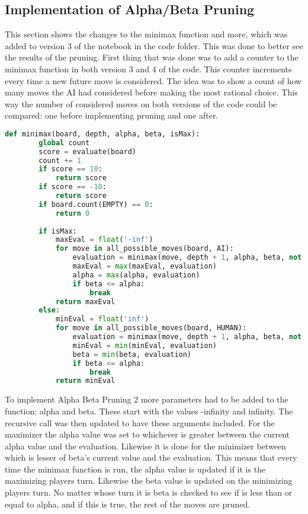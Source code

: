 \subsection{Implementation of Alpha/Beta Pruning}
\label{subsec:Implementation of Alpha/Beta Pruning}
This section shows the changes to the minimax function and more, which was added to version 3 of the notebook in the code folder. This was done to better see the results of the pruning. 
First thing that was done was to add a counter to the minimax function in both version 3 and 4 of the code. This counter increments every time a new future move is considered. 
The idea was to show a count of how many moves the AI had considered before making the most rational choice. This way the number of considered moves on both versions of the code could be compared:
one before implementing pruning and one after.
\begin{lstlisting}[language=python, caption={python example}, label={Script}, basicstyle=\ttfamily\small]
    def minimax(board, depth, alpha, beta, isMax):
        global count 
        score = evaluate(board)
        count += 1
        if score == 10: 
            return score
        if score == -10:
            return score
        if board.count(EMPTY) == 0:
            return 0
        
        if isMax:
            maxEval = float('-inf')
            for move in all_possible_moves(board, AI):
                evaluation = minimax(move, depth + 1, alpha, beta, not isMax)
                maxEval = max(maxEval, evaluation)
                alpha = max(alpha, evaluation)
                if beta <= alpha:
                    break
            return maxEval
        else:
            minEval = float('inf')
            for move in all_possible_moves(board, HUMAN):
                evaluation = minimax(move, depth + 1, alpha, beta, not isMax)
                minEval = min(minEval, evaluation)
                beta = min(beta, evaluation)
                if beta <= alpha:
                    break
            return minEval
\end{lstlisting}
To implement Alpha Beta Pruning 2 more parameters had to be added to the function: alpha and beta. These start with the values -infinity and infinity.
The recursive call was then updated to have these arguments included. For the maximizer the alpha value was set to whichever is greater between the current alpha value and the evaluation.
Likewise it is done for the minimizer between which is lesser of beta's current value and the evaluation. This means that every time the minimax function is run, the alpha value is updated if it is the maximizing players turn. 
Likewise the beta value is updated on the minimizing players turn.
No matter whose turn it is beta is checked to see if is less than or equal to alpha, and if this is true, the rest of the moves are pruned.
\clearpage